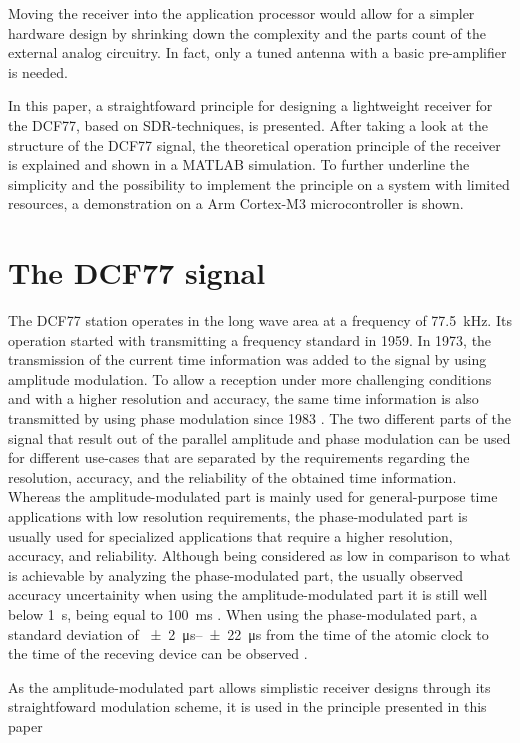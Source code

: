 \documentclass[conference]{IEEEtran}
\begin{document}
Moving the receiver into the application processor would allow for a simpler hardware design by shrinking down the complexity and the parts count of the
external analog circuitry. In fact, only a tuned antenna with a basic pre-amplifier is needed.
\par
In this paper, a straightfoward principle for designing a lightweight receiver for the DCF77, based on SDR-techniques, is presented.
After taking a look at the structure of the DCF77 signal, the theoretical operation principle of the receiver is explained and shown in a MATLAB simulation.
To further underline the simplicity and the possibility to implement the principle on a system with limited resources, a demonstration on a Arm Cortex-M3 microcontroller
is shown.

\section{The DCF77 signal}
The DCF77 station operates in the long wave area at a frequency of \SI{77.5}{\kilo\hertz}.
Its operation started with transmitting a frequency standard in 1959.
In 1973, the transmission of the current time information was added to the signal by using amplitude modulation.
To allow a reception under more challenging conditions and with a higher resolution and accuracy, the same time information is also transmitted by using phase modulation since 1983 \cite{b3}.
The two different parts of the signal that result out of the parallel amplitude and phase modulation can be used for different use-cases that are separated by the
requirements regarding the resolution, accuracy, and the reliability of the obtained time information. 
Whereas the amplitude-modulated part is mainly used for general-purpose time applications with low resolution requirements, the phase-modulated part is usually used
for specialized applications that require a higher resolution, accuracy, and reliability.
Although being considered as low in comparison to what is achievable by analyzing the phase-modulated part, the usually observed accuracy uncertainity when using the
amplitude-modulated part it is still well below \SI{1}{\second}, being equal to \SI{100}{\milli\second} \cite{b2}.
When using the phase-modulated part, a standard deviation of \SIrange{\pm 2}{\pm 22}{\micro\second} from the time of the atomic clock to the time of the receving device can be observed \cite{b4}.
\par
As the amplitude-modulated part allows simplistic receiver designs through its straightfoward modulation scheme, it is used in the principle presented in this paper
\end{document}
